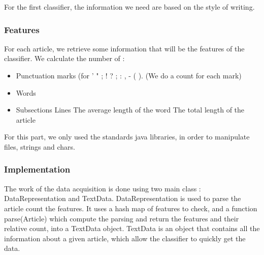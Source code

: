 For the first classifier, the information we need are based on the style of writing.

\subsubsection{Features}

For each article, we retrieve some information that will be the features of the classifier. We calculate the number of : 
\begin{itemize}
	\item Punctuation marks (for ' " ; ! ? ; : , - ( ). (We do a count for each mark)
	\item Words
	\item Subsections
	\line Lines
	\line The average length of the word
	\line The total length of the article
\end{itemize}

For this part, we only used the standards java libraries, in order to manipulate files, strings and chars. 

\subsubsection{Implementation}

The work of the data acquisition is done using two main class : DataRepresentation and TextData.
DataRepresentation is used to parse the article count the features. It uses a hash map of features to check, and a function parse(Article) which compute the parsing and return the features and their relative count, into a TextData object.
TextData is an object that contains all the information about a given article, which allow the classifier to quickly get the data. 
